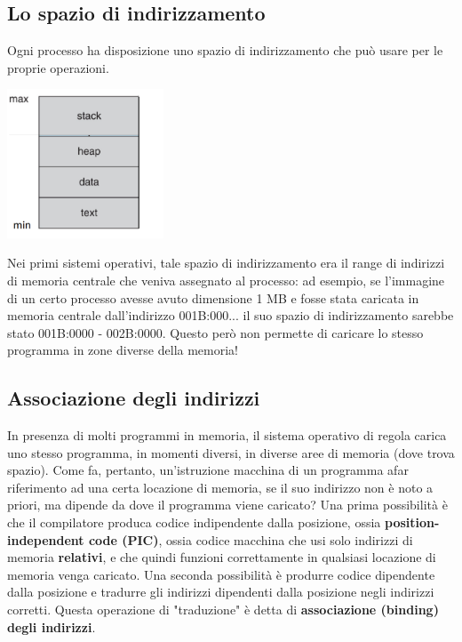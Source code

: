 \documentclass[12pt]{article}
\begin{document}
\subsection{Lo spazio di indirizzamento}
Ogni processo ha disposizione uno spazio di indirizzamento che può usare per le proprie operazioni.
\begin{center}
    \includegraphics[width = 0.35\textwidth]{Images/18.png}
\end{center}
Nei primi sistemi operativi, tale spazio di indirizzamento era il range di indirizzi di memoria centrale che veniva assegnato al processo:
ad esempio, se l'immagine di un certo processo avesse avuto dimensione 1 MB e fosse stata caricata in memoria centrale dall'indirizzo 001B:000... il suo spazio di indirizzamento sarebbe
stato 001B:0000 - 002B:0000. Questo però non permette di caricare lo stesso programma in zone diverse della memoria!
\subsection{Associazione degli indirizzi}
In presenza di molti programmi in memoria, il sistema operativo di regola carica uno stesso programma, in momenti diversi, in diverse aree di memoria (dove trova spazio).
Come fa, pertanto, un'istruzione macchina di un programma afar riferimento ad una certa locazione di memoria, se il suo indirizzo non è noto a priori, ma dipende da dove il programma viene caricato?
Una prima possibilità è che il compilatore produca codice indipendente dalla posizione, ossia \textbf{position-independent code (PIC)}, ossia codice macchina che usi solo indirizzi di memoria \textbf{relativi}, e che quindi
funzioni correttamente in qualsiasi locazione di memoria venga caricato. Una seconda possibilità è produrre codice dipendente dalla posizione e tradurre gli indirizzi dipendenti dalla posizione negli indirizzi corretti.
Questa operazione di "traduzione" è detta di \textbf{associazione (binding) degli indirizzi}.
\end{document}
